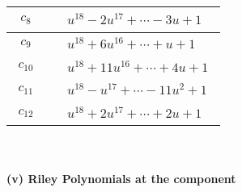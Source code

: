 \documentclass[1p]{elsarticle_modified}
\theoremstyle{definition}
\begin{document}
\begin{tabular}{m{50pt}|m{274pt}}
\hline $$\begin{aligned}c_{8}\end{aligned}$$&$\begin{aligned}
&u^{18}-2 u^{17}+\cdots-3 u+1
\end{aligned}$\\
\hline $$\begin{aligned}c_{9}\end{aligned}$$&$\begin{aligned}
&u^{18}+6 u^{16}+\cdots+u+1
\end{aligned}$\\
\hline $$\begin{aligned}c_{10}\end{aligned}$$&$\begin{aligned}
&u^{18}+11 u^{16}+\cdots+4 u+1
\end{aligned}$\\
\hline $$\begin{aligned}c_{11}\end{aligned}$$&$\begin{aligned}
&u^{18}- u^{17}+\cdots-11 u^2+1
\end{aligned}$\\
\hline $$\begin{aligned}c_{12}\end{aligned}$$&$\begin{aligned}
&u^{18}+2 u^{17}+\cdots+2 u+1
\end{aligned}$\\
\hline
\end{tabular}\\~\\
\newpage\renewcommand{\arraystretch}{1}
\flushleft \textbf{(v) Riley Polynomials at the component}\newline \\
\end{document}
